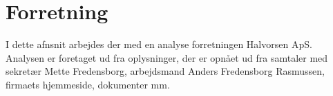 \section{Forretning}

I dette afnsnit arbejdes der med en analyse forretningen Halvorsen ApS.
Analysen er foretaget ud fra oplysninger, der er opnået ud fra samtaler med sekretær Mette Fredensborg, arbejdsmand Anders Fredensborg Rasmussen, firmaets hjemmeside, dokumenter mm.



